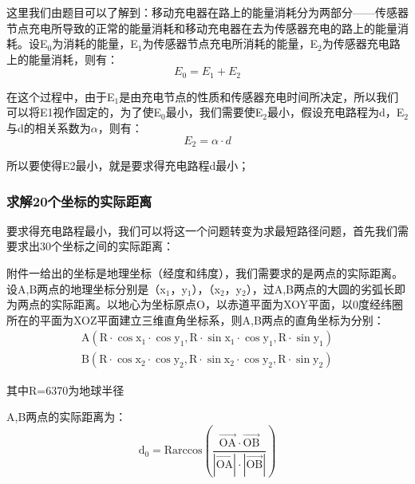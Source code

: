 \documentclass{article}
\begin{document}
\vspace{0.5ex}

这里我们由题目可以了解到：移动充电器在路上的能量消耗分为两部分——传感器节点充电所导致的正常的能量消耗和移动充电器在去为传感器充电的路上的能量消耗。设E$_0$为消耗的能量，E$_1$为传感器节点充电所消耗的能量，E$_2$为传感器充电路上的能量消耗，则有：
\begin{equation}
    E_0 = E_1 + E_2     %
    \tag{1}             %
\end{equation}      %

在这个过程中，由于E$_1$是由充电节点的性质和传感器充电时间所决定，所以我们可以将E1视作固定的，为了使E$_0$最小，我们需要使E$_2$最小，假设充电路程为d，E$_2$与d的相关系数为$\alpha$，则有：
\begin{equation}
    E_2 = \alpha \cdot d   %
    \tag{2}             
\end{equation}      

所以要使得E2最小，就是要求得充电路程d最小；


\subsubsection{求解20个坐标的实际距离}
要求得充电路程最小，我们可以将这一个问题转变为求最短路径问题，首先我们需要求出30个坐标之间的实际距离\cite{ref4}：

附件一给出的坐标是地理坐标（经度和纬度），我们需要求的是两点的实际距离。设A,B两点的地理坐标分别是（x$_1$，y$_1$），（x$_2$，y$_2$），过A,B两点的大圆的劣弧长即为两点的实际距离。以地心为坐标原点O，以赤道平面为XOY平面，以0度经纬圈所在的平面为XOZ平面建立三维直角坐标系，则A,B两点的直角坐标为分别：
\begin{gather}    %
    \mathrm {A\left(R \cdot \cos x_1 \cdot \cos y_1, R \cdot \sin x_1 \cdot \cos y_1, R \cdot \sin y_1\right)} \tag{3} \\
    \mathrm {B\left(R \cdot \cos x_2 \cdot \cos y_2, R \cdot \sin x_2 \cdot \cos y_2, R \cdot \sin y_2\right)} \tag{4}            
\end{gather}    %

其中R=6370为地球半径

A,B两点的实际距离为：
\begin{equation}
    \mathrm {\left.d_0 = Rarccos {\left(\frac{\overrightarrow{O A} \cdot \overrightarrow{O B}}{|\overrightarrow{O A}| \cdot|\overrightarrow{O B}|}\right.}\right)}
    \tag{5}
\end{equation}      %
\end{document}
